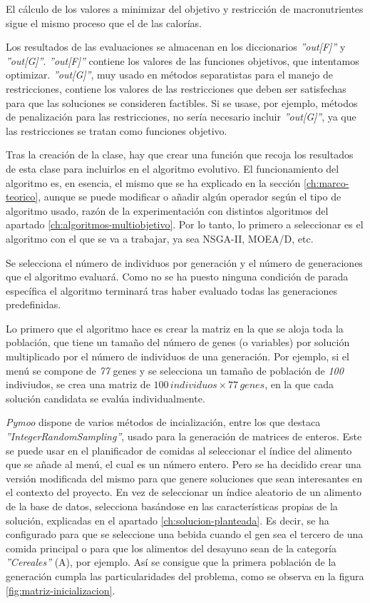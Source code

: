 El cálculo de los valores a minimizar del objetivo y restricción de macronutrientes sigue el mismo proceso que el de las calorías.

Los resultados de las evaluaciones se almacenan en los diccionarios \textit{''out[F]''} y \textit{''out[G]''}. \textit{''out[F]''} contiene los valores de las funciones objetivos, que intentamos optimizar. \textit{''out[G]''}, muy usado en métodos separatistas para el manejo de restricciones, contiene los valores de las restricciones que deben ser satisfechas para que las soluciones se consideren factibles. Si se usase, por ejemplo, métodos de penalización para las restricciones, no sería necesario incluir \textit{''out[G]''}, ya que las restricciones se tratan como funciones objetivo. 

Tras la creación de la clase, hay que crear una función que recoja los resultados de esta clase para incluirlos en el algoritmo evolutivo. El funcionamiento del algoritmo es, en esencia, el mismo que se ha explicado en la sección \ref{ch:marco-teorico}, aunque se puede modificar o añadir algún operador según el tipo de algoritmo usado, razón de la experimentación con distintos algoritmos del apartado \ref{ch:algoritmos-multiobjetivo}. Por lo tanto, lo primero a seleccionar es el algoritmo con el que se va a trabajar, ya sea NSGA-II, MOEA/D, etc.

Se selecciona el número de individuos por generación y el número de generaciones que el algoritmo evaluará. Como no se ha puesto ninguna condición de parada específica el algoritmo terminará tras haber evaluado todas las generaciones predefinidas.

Lo primero que el algoritmo hace es crear la matriz en la que se aloja toda la población, que tiene un tamaño del número de genes (o variables) por solución multiplicado por el número de individuos de una generación. Por ejemplo, si el menú se compone de \textit{77} genes y se selecciona un tamaño de población de \textit{100} indiviudos, se crea una matriz de \(100 \, individuos \times 77 \, genes\), en la que cada solución candidata se evalúa individualmente.

\textit{Pymoo} dispone de varios métodos de incialización, entre los que destaca \textit{''IntegerRandomSampling''}, usado para la generación de matrices de enteros. Este se puede usar en el planificador de comidas al seleccionar el índice del alimento que se añade al menú, el cual es un número entero. Pero se ha decidido crear una versión modificada del mismo para que genere soluciones que sean interesantes en el contexto del proyecto. En vez de seleccionar un índice aleatorio de un alimento de la base de datos, selecciona basándose en las características propias de la solución, explicadas en el apartado \ref{ch:solucion-planteada}. Es decir, se ha configurado para que se seleccione una bebida cuando el gen sea el tercero de una comida principal o para que los alimentos del desayuno sean de la categoría \textit{''Cereales''} (A), por ejemplo. Así se consigue que la primera población de la generación cumpla las particularidades del problema, como se observa en la figura \ref{fig:matriz-inicializacion}.

